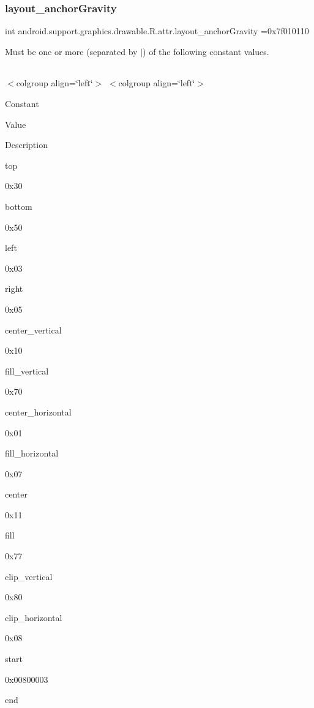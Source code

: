 \subsubsection{\texorpdfstring{layout\+\_\+anchor\+Gravity}{layout\_anchorGravity}}
{\footnotesize\ttfamily int android.\+support.\+graphics.\+drawable.\+R.\+attr.\+layout\+\_\+anchor\+Gravity =0x7f010110\hspace{0.3cm}{\ttfamily [static]}}

Must be one or more (separated by \textquotesingle{}$\vert$\textquotesingle{}) of the following constant values.

\tabulinesep=1mm
\begin{longtabu} spread 0pt [c]{*{0}{|X[-1]}|}
\hline
\end{longtabu}
$<$colgroup align=\char`\"{}left\char`\"{}$>$ $<$colgroup align=\char`\"{}left\char`\"{}$>$ 

Constant

Value

Description 

{\ttfamily top}

0x30

{\ttfamily bottom}

0x50

{\ttfamily left}

0x03

{\ttfamily right}

0x05

{\ttfamily center\+\_\+vertical}

0x10

{\ttfamily fill\+\_\+vertical}

0x70

{\ttfamily center\+\_\+horizontal}

0x01

{\ttfamily fill\+\_\+horizontal}

0x07

{\ttfamily center}

0x11

{\ttfamily fill}

0x77

{\ttfamily clip\+\_\+vertical}

0x80

{\ttfamily clip\+\_\+horizontal}

0x08

{\ttfamily start}

0x00800003

{\ttfamily end}

